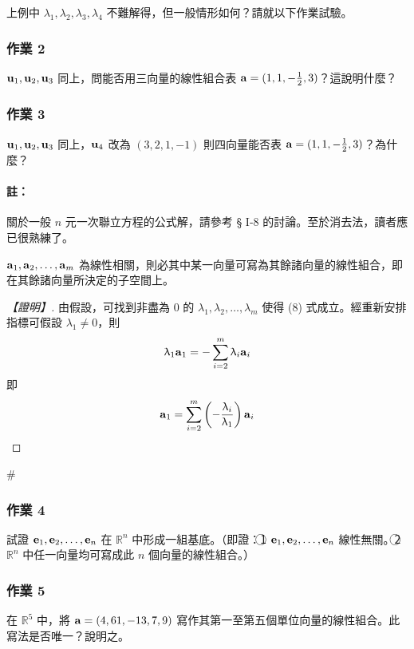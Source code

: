 上例中 $\lambda_1, \lambda_2, \lambda_3, \lambda_4$ 不難解得，但一般情形如何？請就以下作業試驗。

\subsubsection*{作業 2}\label{hw:b6-1-2}
$\boldsymbol{\mathbf{u}}_1, \boldsymbol{\mathbf{u}}_2, \boldsymbol{\mathbf{u}}_3$ 同上，問能否用三向量的線性組合表 $\boldsymbol{\mathbf{a}}=(1, 1, -\frac{1}{2}, 3)$？這說明什麼？

\subsubsection*{作業 3}\label{hw:b6-1-3}
$\boldsymbol{\mathbf{u}}_1, \boldsymbol{\mathbf{u}}_2, \boldsymbol{\mathbf{u}}_3$ 同上，$\boldsymbol{\mathbf{u}}_4$ 改為 $(3, 2, 1, -1)$ 則四向量能否表 $\boldsymbol{\mathbf{a}}=(1, 1, -\frac{1}{2}, 3)$？為什麼？

\paragraph{註：}關於一般 $n$ 元一次聯立方程的公式解，請參考 § I-8 的討論。至於消去法，讀者應已很熟練了。

\begin{theorem}\label{thm:b6-1-1}
$\boldsymbol{\mathbf{a}}_1, \boldsymbol{\mathbf{a}}_2, \dots, \boldsymbol{\mathbf{a}}_m$ 為線性相關，則必其中某一向量可寫為其餘諸向量的線性組合，即在其餘諸向量所決定的子空間上。
\end{theorem}

\begin{proof}[【證明】]
由假設，可找到非盡為 0 的 $\lambda_1, \lambda_2, \dots, \lambda_m$ 使得 (8) 式成立。經重新安排指標可假設 $\lambda_1 \ne 0$，則
\[ \uplambda_1 \boldsymbol{\mathbf{a}}_1 = - \sum_{i=2}^m \uplambda_i \boldsymbol{\mathbf{a}}_i \]
即
\[ \boldsymbol{\mathbf{a}}_1 = \sum_{i=2}^m \left(-\dfrac{\uplambda_i}{\uplambda_1}\right) \boldsymbol{\mathbf{a}}_i \]
\end{proof}\hfill$\#$

\subsubsection*{作業 4}\label{hw:b6-1-4}
試證 $\boldsymbol{\mathbf{e}}_1, \boldsymbol{\mathbf{e}}_2, \dots, \boldsymbol{\mathbf{e}}_n$ 在 $\mathbb{R}^n$ 中形成一組基底。（即證：\textcircled{1} $\boldsymbol{\mathbf{e}}_1, \boldsymbol{\mathbf{e}}_2, \dots, \boldsymbol{\mathbf{e}}_n$ 線性無關。\textcircled{2} $\mathbb{R}^n$ 中任一向量均可寫成此 $n$ 個向量的線性組合。）

\subsubsection*{作業 5}\label{hw:b6-1-5}
在 $\mathbb{R}^5$ 中，將 $\boldsymbol{\mathbf{a}}=(4, 61, -13, 7, 9)$ 寫作其第一至第五個單位向量的線性組合。此寫法是否唯一？說明之。

